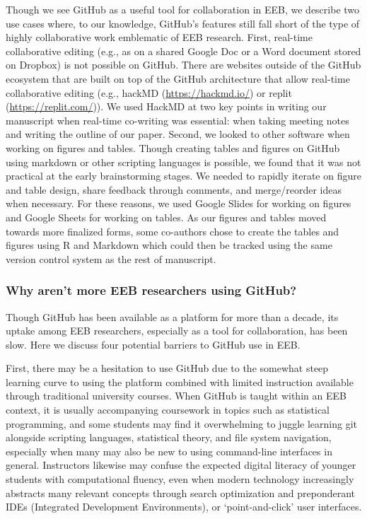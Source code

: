 Though we see GitHub as a useful tool for collaboration in EEB, we describe two use cases where, to our knowledge, GitHub's features still fall short of the type of highly collaborative work emblematic of EEB research.
First, real-time collaborative editing (e.g., as on a shared Google Doc or a Word document stored on Dropbox) is not possible on GitHub.
There are websites outside of the GitHub ecosystem that are built on top of the GitHub architecture that allow real-time collaborative editing (e.g., hackMD (\url{https://hackmd.io/}) or replit (\url{https://replit.com/})).
We used HackMD at two key points in writing our manuscript when real-time co-writing was essential: when taking meeting notes and writing the outline of our paper.
Second, we looked to other software when working on figures and tables.
Though creating tables and figures on GitHub using markdown or other scripting languages is possible, we found that it was not practical at the early brainstorming stages.
We needed to rapidly iterate on figure and table design, share feedback through comments, and merge/reorder ideas when necessary.
For these reasons, we used Google Slides for working on figures and Google Sheets for working on tables.
As our figures and tables moved towards more finalized forms, some co-authors chose to create the tables and figures using R and Markdown which could then be tracked using the same version control system as the rest of manuscript.

\hypertarget{why-arent-more-eeb-researchers-using-github}{%
\subsubsection{Why aren't more EEB researchers using GitHub?}\label{why-arent-more-eeb-researchers-using-github}}

Though GitHub has been available as a platform for more than a decade, its uptake among EEB researchers, especially as a tool for collaboration, has been slow.
Here we discuss four potential barriers to GitHub use in EEB.

First, there may be a hesitation to use GitHub due to the somewhat steep learning curve to using the platform combined with limited instruction available through traditional university courses.
When GitHub is taught within an EEB context, it is usually accompanying coursework in topics such as statistical programming, and some students may find it overwhelming to juggle learning git alongside scripting languages, statistical theory, and file system navigation, especially when many may also be new to using command-line interfaces in general.
Instructors likewise may confuse the expected digital literacy of younger students with computational fluency, even when modern technology increasingly abstracts many relevant concepts through search optimization and preponderant IDEs (Integrated Development Environments), or `point-and-click' user interfaces.

